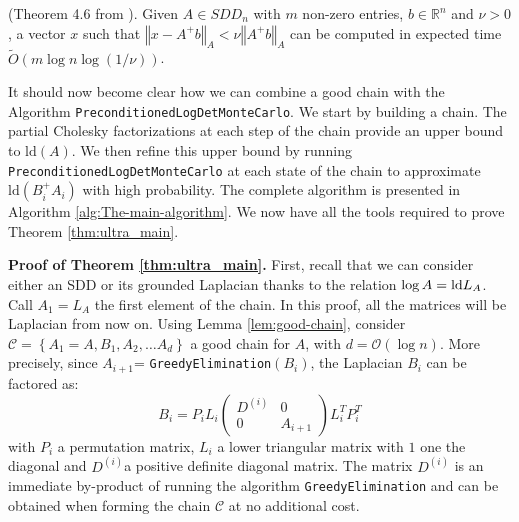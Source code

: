 \begin{lemma} \label{lem:linear-precond-existence}(Theorem 4.6 from
\cite{Koutis2011}). Given $A\in SDD_{n}$ with $m$ non-zero entries,
$b\in\mathbb{R}^{n}$ and $\nu>0$, a vector $x$ such that $\left\Vert x-A^{+}b\right\Vert _{A}<\nu\left\Vert A^{+}b\right\Vert _{A}$
can be computed in expected time $\tilde{O}\left(m\log n\log\left(1/\nu\right)\right)$.\end{lemma}

It should now become clear how we can combine a good
chain with the Algorithm \texttt{PreconditionedLogDetMonteCarlo}.
We start by building a chain. The partial Cholesky factorizations
at each step of the chain provide an upper bound to $\mbox{ld}\left(A\right)$.
We then refine this upper bound by running \texttt{PreconditionedLogDetMonteCarlo}
at each state of the chain to approximate $\mbox{ld}\left(B_{i}^{+}A_{i}\right)$
with high probability. The complete algorithm is presented in Algorithm
\ref{alg:The-main-algorithm}. We now have all the tools required
to prove Theorem \ref{thm:ultra_main}.

\textbf{Proof of Theorem \ref{thm:ultra_main}.} First, recall that
we can consider either an SDD or its grounded Laplacian thanks to
the relation $\log A=\text{\textnormal{ld}} L_{A}$. Call $A_{1}=L_{A}$ the first element
of the chain. In this proof, all the matrices will be Laplacian from
now on. Using Lemma \ref{lem:good-chain}, consider $\mathcal{C}=\left\{ A_{1}=A,B_{1},A_{2},\dots A_{d}\right\} $ a good chain for $A$, with
$d=\mathcal{O}\left(\log n\right)$. More precisely, since $A_{i+1}$=
\texttt{GreedyElimination}$\left(B_{i}\right)$, the Laplacian $B_{i}$
can be factored as:
\[
B_{i}=P_{i}L_{i}\left(\begin{array}{cc}
D^{\left(i\right)}& 0\\
0 & A_{i+1}
\end{array}\right)L_{i}^{T}P_{i}^{T}
\]
with $P_{i}$ a permutation matrix, $L_{i}$ a lower triangular matrix
with $1$ one the diagonal and $D^{\left(i\right)}$a positive definite
diagonal matrix. The matrix $D^{\left(i\right)}$ is an immediate
by-product of running the algorithm \texttt{GreedyElimination} and
can be obtained when forming the chain $\mathcal{C}$ at no additional
cost.

